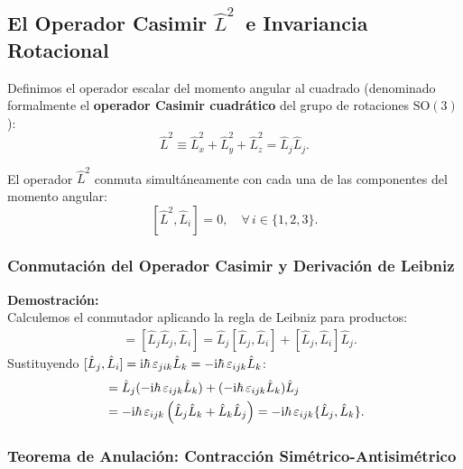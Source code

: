 \subsection{El Operador Casimir \texorpdfstring{$\hat{L}^2$}{L\textasciicircum 2}\ e Invariancia Rotacional}

Definimos el operador escalar del momento angular al cuadrado (denominado formalmente el \textbf{operador Casimir cuadrático} del grupo de rotaciones $\mathrm{SO}(3)$):
\begin{equation}
    \hat{L}^2 \equiv \hat{L}_x^2 + \hat{L}_y^2 + \hat{L}_z^2 = \hat{L}_j\hat{L}_j.
    \label{eq:casimir_def}
\end{equation}

\begin{teoremabox}
    El operador $\hat{L}^2$ conmuta simultáneamente con cada una de las componentes del momento angular:
    \begin{equation}
        \boxed{[\hat{L}^2, \hat{L}_i] = 0, \quad \forall\,i \in \{1, 2, 3\}}.
        \label{eq:l2_comm}
    \end{equation}
\end{teoremabox}

\subsubsection{Conmutación del Operador Casimir y Derivación de Leibniz}

\textbf{Demostración:}\\
Calculemos el conmutador aplicando la regla de Leibniz para productos:
\begin{align}
    [\hat{L}^2, \hat{L}_i] &= [\hat{L}_j\hat{L}_j, \hat{L}_i] = \hat{L}_j[\hat{L}_j, \hat{L}_i] + [\hat{L}_j, \hat{L}_i]\hat{L}_j.
\end{align}
Sustituyendo $[\hat{L}_j, \hat{L}_i] = \mathrm{i}\hbar\,\varepsilon_{jik}\hat{L}_k = -\mathrm{i}\hbar\,\varepsilon_{ijk}\hat{L}_k$:
\begin{align}
    [\hat{L}^2, \hat{L}_i] &= \hat{L}_j(-\iu\hbar\,\varepsilon_{ijk}\hat{L}_k) + (-\iu\hbar\,\varepsilon_{ijk}\hat{L}_k)\hat{L}_j \nonumber\\
    &= -\iu\hbar\,\varepsilon_{ijk}\left( \hat{L}_j\hat{L}_k + \hat{L}_k\hat{L}_j \right) = -\iu\hbar\,\varepsilon_{ijk}\{\hat{L}_j, \hat{L}_k\}.
    \label{eq:casimir_step}
\end{align}

\subsubsection{Teorema de Anulación: Contracción Simétrico-Antisimétrico}

